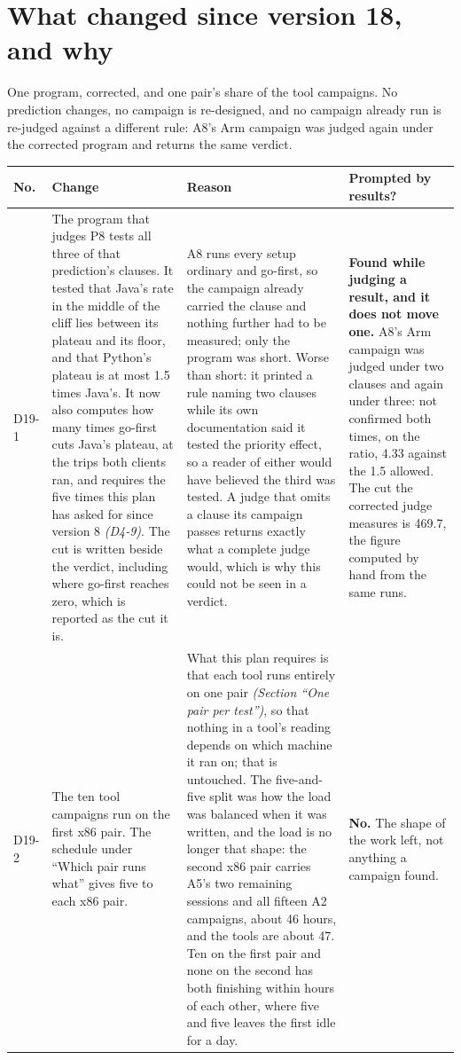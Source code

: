 \documentclass[11pt]{article}
\newcommand{\gl}[1]{{\color{soft}\itshape\small (#1)}}
\begin{document}
\section*{What changed since version 18, and why}
One program, corrected, and one pair's share of the tool campaigns. No prediction changes, no
campaign is re-designed, and no campaign already run is re-judged against a different rule: A8's
Arm campaign was judged again under the corrected program and returns the same verdict.

{\small
\begin{longtable}{@{}p{1.1cm} >{\raggedright\arraybackslash}p{6.1cm} >{\raggedright\arraybackslash}p{6.0cm} >{\raggedright\arraybackslash}p{2.2cm}@{}}
\toprule
\textbf{No.} & \textbf{Change} & \textbf{Reason} & \textbf{Prompted by results?} \\
\midrule
\endhead
D19-1 & The program that judges P8 tests all three of that prediction's clauses. It tested that Java's rate in the middle of the cliff lies between its plateau and its floor, and that Python's plateau is at most 1.5 times Java's. It now also computes how many times go-first cuts Java's plateau, at the trips both clients ran, and requires the five times this plan has asked for since version 8 \gl{D4-9}. The cut is written beside the verdict, including where go-first reaches zero, which is reported as the cut it is. & A8 runs every setup ordinary and go-first, so the campaign already carried the clause and nothing further had to be measured; only the program was short. Worse than short: it printed a rule naming two clauses while its own documentation said it tested the priority effect, so a reader of either would have believed the third was tested. A judge that omits a clause its campaign passes returns exactly what a complete judge would, which is why this could not be seen in a verdict. & \textbf{Found while judging a result, and it does not move one.} A8's Arm campaign was judged under two clauses and again under three: not confirmed both times, on the ratio, 4.33 against the 1.5 allowed. The cut the corrected judge measures is 469.7, the figure computed by hand from the same runs. \\
D19-2 & The ten tool campaigns run on the first x86 pair. The schedule under ``Which pair runs what'' gives five to each x86 pair. & What this plan requires is that each tool runs entirely on one pair \gl{Section ``One pair per test''}, so that nothing in a tool's reading depends on which machine it ran on; that is untouched. The five-and-five split was how the load was balanced when it was written, and the load is no longer that shape: the second x86 pair carries A5's two remaining sessions and all fifteen A2 campaigns, about 46 hours, and the tools are about 47. Ten on the first pair and none on the second has both finishing within hours of each other, where five and five leaves the first idle for a day. & \textbf{No.} The shape of the work left, not anything a campaign found. \\
\bottomrule
\end{longtable}}
\end{document}
